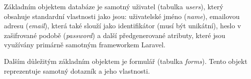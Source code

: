 Základním objektem databáze je samotný uživatel (tabulka \textit{users}), který obsahuje standardní vlastnosti jako jsou: uživatelské jméno (\textit{name}), emailovou adresu (\textit{email}), která také slouží jako identifikátor (musí být unikátní), heslo v zašifrované podobě (\textit{password}) a další předgenerované atributy, které jsou využívány primárně samotným frameworkem Laravel.

Dalším důležitým základním objektem je formulář (tabulka \textit{forms}). Tento objekt reprezentuje samotný dotazník a jeho vlastnosti.

